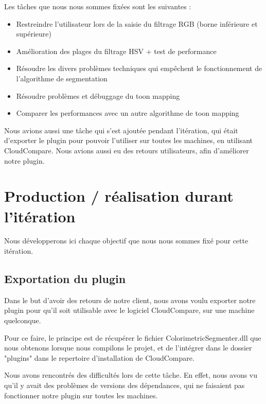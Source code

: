 \documentclass[12pt,titlepage,french]{article}
\begin{document}
Les tâches que nous nous sommes fixées sont les suivantes :

\begin{itemize}
    \item Restreindre l'utilisateur lors de la saisie du filtrage RGB (borne inférieure et supérieure)
    \item Amélioration des plages du filtrage HSV + test de performance
    \item Résoudre les divers problèmes techniques qui empêchent le fonctionnement de l'algorithme de segmentation
    \item Résoudre problèmes et débuggage du toon mapping
    \item Comparer les performances avec un autre algorithme de toon mapping
\end{itemize}

Nous avions aussi une tâche qui s'est ajoutée pendant l'itération, qui était d'exporter le plugin pour pouvoir l'utiliser sur toutes les machines, en utilisant CloudCompare. Nous avions aussi eu des retours utilisateurs, afin d'améliorer notre plugin.

\section{Production / réalisation durant l'itération}

Nous développerons ici chaque objectif que nous nous sommes fixé pour cette itération.


\subsection{Exportation du plugin}

Dans le but d'avoir des retours de notre client, nous avons voulu exporter notre plugin pour qu'il soit utilisable avec le logiciel CloudCompare, sur une machine quelconque. \newline

Pour ce faire, le principe est de récupérer le fichier ColorimetricSegmenter.dll que nous obtenons lorsque nous compilons le projet, et de l'intégrer dans le dossier "plugins" dans le repertoire d'installation de CloudCompare. \newline

Nous avons rencontrés des difficultés lors de cette tâche. En effet, nous avons vu qu'il y avait des problèmes de versions des dépendances, qui ne faisaient pas fonctionner notre plugin sur toutes les machines. \newline
\end{document}
